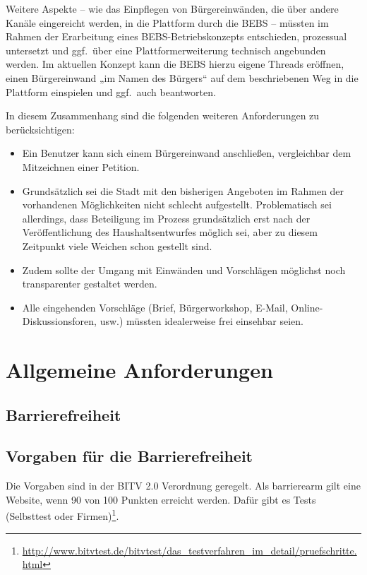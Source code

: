 \documentclass[11pt,a4paper,twoside]{article}
\begin{document}
Weitere Aspekte -- wie das Einpflegen von Bürgereinwänden, die über andere
Kanäle eingereicht werden, in die Plattform durch die BEBS -- müssten im
Rahmen der Erarbeitung eines BEBS-Betriebskonzepts entschieden, prozessual
untersetzt und ggf.\ über eine Plattformerweiterung technisch angebunden
werden.  Im aktuellen Konzept kann die BEBS hierzu eigene Threads eröffnen,
einen Bürgereinwand „im Namen des Bürgers“ auf dem beschriebenen Weg in die
Plattform einspielen und ggf.\ auch beantworten. 

In diesem Zusammenhang sind die folgenden weiteren Anforderungen zu
berücksichtigen: 
\begin{itemize}
\item Ein Benutzer kann sich einem Bürgereinwand anschließen, vergleichbar dem
  Mitzeichnen einer Petition.
\item Grundsätzlich sei die Stadt mit den bisherigen Angeboten im Rahmen der
  vorhandenen Möglichkeiten nicht schlecht aufgestellt. Problematisch sei
  allerdings, dass Beteiligung im Prozess grundsätzlich erst nach der
  Veröffentlichung des Haushaltsentwurfes möglich sei, aber zu diesem
  Zeitpunkt viele Weichen schon gestellt sind.
\item Zudem sollte der Umgang mit Einwänden und Vorschlägen möglichst noch
  transparenter gestaltet werden.
\item Alle eingehenden Vorschläge (Brief, Bürgerworkshop, E-Mail,
  Online-Diskussionsforen, usw.) müssten idealerweise frei einsehbar seien.
\end{itemize}

\section{Allgemeine Anforderungen} 

\subsection{Barrierefreiheit} 

\subsection*{Vorgaben für die Barrierefreiheit}

Die Vorgaben sind in der BITV 2.0 Verordnung geregelt.  Als barrierearm gilt
eine Website, wenn 90 von 100 Punkten erreicht werden.  Dafür gibt es Tests
(Selbsttest oder
Firmen)\footnote{\url{http://www.bitvtest.de/bitvtest/das_testverfahren_im_detail/pruefschritte.html}}.
\end{document}
